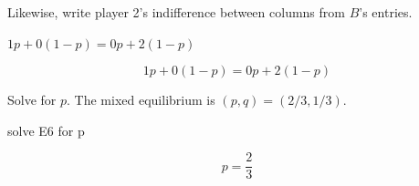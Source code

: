 \documentclass[dvipdfmx]{article}
\begin{document}
Likewise, write player 2's indifference between columns from $B$'s entries.

$1 p + 0 (1-p) = 0 p + 2 (1-p)$

\begin{equation}
  1 p + 0 (1-p) = 0 p + 2 (1-p)
  \label{eq:E6}
\end{equation}

Solve for $p$. The mixed equilibrium is $(p,q)=(2/3, 1/3)$.

solve E6 for p

\begin{equation}
  p = \frac{2}{3}
  \label{eq:E7}
\end{equation}
\end{document}
